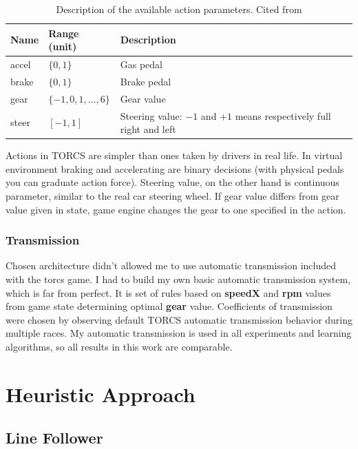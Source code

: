 \documentclass[declaration,shortabstract,english,inz]{iithesis}
\begin{document}
\begin{table}[h]
    \centering
    \begin{tabular}{|p{1.2cm}|p{2.8cm}|p{8.5cm}|}
        \hline
        \textbf{Name} & \textbf{Range (unit)} & \textbf{Description} \\ 
        \hline
        accel & $\{0,1\}$ & Gas pedal \\ 
     \hline
     brake &  $\{0,1\}$ & Brake pedal \\ 
     \hline
     gear & $\{-1,0,1,\dots ,6\}$ & Gear value \\ 
     \hline
     steer &  $[-1,1]$ & Steering value: $-1$ and $+1$ means respectively full right and
     left \\ 
     \hline
    \end{tabular}
    
    \caption{\label{tab:torcs_actions}Description of the available  action parameters. Cited from \cite{scrc_manual}}
\end{table}

Actions in TORCS are simpler than ones taken by drivers in real life.
In virtual environment braking and accelerating are binary decisions (with physical pedals you can graduate action force).
Steering value, on the other hand is continuous parameter, similar to the real car steering wheel.
If gear value differs from  gear value given in state, game engine changes the gear to one specified in the action.

\subsection{Transmission}


Chosen architecture didn’t allowed me to use automatic transmission included with the torcs game.
I had to build my own basic automatic transmission system, which is far from perfect.
It is set of rules based on \textbf{speedX} and \textbf{rpm} values from game state determining optimal \textbf{gear} value.
Coefficients of transmission were chosen by observing default TORCS automatic transmission behavior during multiple races.
My automatic transmission is used in all experiments and learning algorithms, so all results in this work are comparable.


\chapter{Heuristic Approach}

\section{Line Follower}
\end{document}
